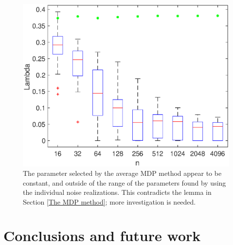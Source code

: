 \documentclass[12pt]{book}
\begin{document}
\begin{figure}
\centering
\includegraphics[width=\textwidth]{Figures/MDP_LamPlot1D_F1_S15_W100_R20.eps}
\caption{The parameter selected by the average MDP method appear to be constant, and outside of the range of the parameters found by using the individual noise realizations. This contradicts the lemma in Section \ref{The MDP method}; more investigation is needed.}
\label{fig:MDPlambdas}
\end{figure}

\chapter{Conclusions and future work} \label{sec:Conclusion}



\end{document}
